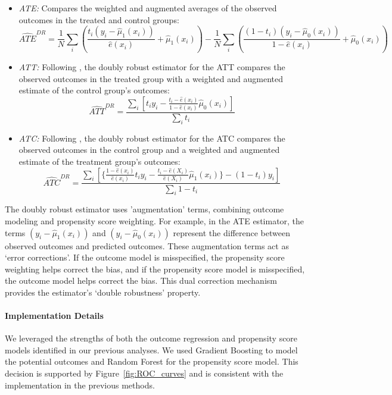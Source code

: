 \documentclass{article}
\begin{document}
\begin{itemize}
    \item \textit{ATE:} Compares the weighted and augmented averages of the observed outcomes in the treated and control groups:
    \[
    \widehat{ATE}^{DR} = \frac{1}{N} \sum_i \left( \frac{t_i (y_i - \hat{\mu}_1(x_i))}{\hat{e}(x_i)} + \hat{\mu}_1(x_i) \right) - \frac{1}{N} \sum_i \left( \frac{(1 - t_i)(y_i - \hat{\mu}_0(x_i))}{1 - \hat{e}(x_i)} + \hat{\mu}_0(x_i) \right)
    \]
    
    \item \textit{ATT:} Following \citet{tao2019doubly}, the doubly robust estimator for the ATT compares the observed outcomes in the treated group with a weighted and augmented estimate of the control group's outcomes: 
    \[
    \widehat{ATT}^{DR} = \frac{\sum_i \left[ t_i y_i - \frac{ t_i - \hat{e}(x_i)}{1 - \hat{e}(x_i)} \hat{\mu}_0(x_i) \right]}{\sum_i t_i}
    \]
    
    \item \textit{ATC:} Following \citet{tao2019doubly}, the doubly robust estimator for the ATC compares the observed outcomes in the control group and a weighted and augmented estimate of the treatment group's outcomes:
    \[
    \widehat{ATC}^{DR} = \frac{\sum_i \left[ \{ \frac{ 1 - \hat{e}(x_i)}{\hat{e}(x_i)} t_i y_i - \frac{ t_i - \hat{e}(X_i)}{\hat{e}(X_i)} \hat{\mu}_1(x_i) \}   - (1-t_i)y_i \right]}{\sum_i 1 - t_i}
    \]
\end{itemize}

The doubly robust estimator uses 'augmentation' terms, combining outcome modeling and propensity score weighting. For example, in the ATE estimator, the terms $(y_i - \hat{\mu}_1(x_i))$ and $(y_i - \hat{\mu}_0(x_i))$ represent the difference between observed outcomes and predicted outcomes. These augmentation terms act as `error corrections'. If the outcome model is misspecified, the propensity score weighting helps correct the bias, and if the propensity score model is misspecified, the outcome model helps correct the bias. This dual correction mechanism provides the estimator's `double robustness' property.

\paragraph{Implementation Details} We leveraged the strengths of both the outcome regression and propensity score models identified in our previous analyses. We used Gradient Boosting to model the potential outcomes and Random Forest for the propensity score model. This decision is supported by Figure~\ref{fig:ROC_curves} and is consistent with the implementation in the previous methods.
\end{document}
